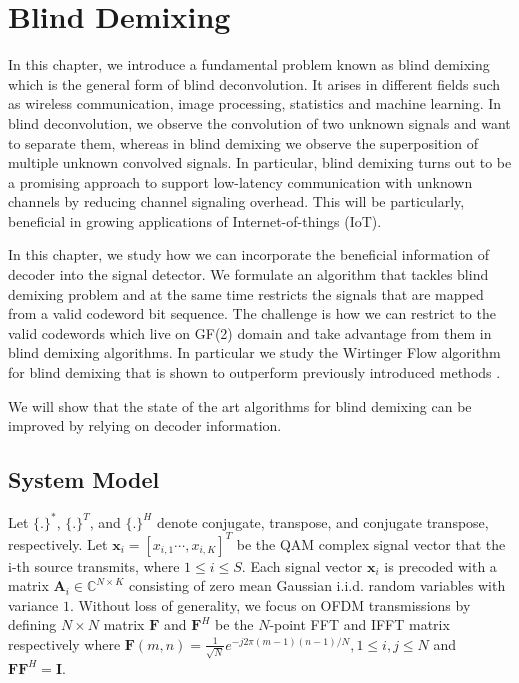 \chapter{Blind Demixing} \label{Chap:demix}
In this chapter, we introduce a fundamental problem known as blind demixing which is the general form of blind deconvolution. 
It arises in different fields such as wireless communication, image processing, statistics and machine learning. 
In blind deconvolution, we observe the convolution of two unknown signals and want to separate them, 
whereas in blind demixing we observe the superposition of multiple unknown convolved signals.
In particular, blind demixing turns out to be a promising approach to support low-latency communication with 
unknown channels by reducing channel signaling overhead. This will be particularly, beneficial in growing applications
of Internet-of-things (IoT).

In this chapter, we study how we can incorporate the beneficial information of decoder
into the signal detector. We formulate an algorithm that tackles blind demixing problem and at the same time
restricts the signals that are mapped from a valid codeword bit sequence. The challenge is how we can restrict to the valid codewords
which live on GF(2) domain and take advantage from them in blind demixing algorithms. In particular we study the Wirtinger Flow algorithm for blind demixing that is shown to 
outperform previously introduced methods \cite{candes2015phase, chen2015solving, ma2017implicit, dong2018nonconvex}. 

We will show that  
the state of the art algorithms for blind demixing can be improved by relying on decoder information.


\section{System Model}
Let $\{.\}^*$, $\{.\}^T$, and $\{.\}^H$ denote conjugate, transpose, and conjugate transpose, respectively.
Let $\mathbf{x}_i=[x_{i,1}\cdots, x_{i,K} ]^T$ be the QAM complex signal vector that the i-th source transmits, where $1\leq i \leq S$. 
Each signal vector $\mathbf{x}_i$ is precoded with a matrix $\mathbf{A}_i \in \mathbb{C} ^{N \times K}$ consisting 
of zero mean Gaussian i.i.d. random variables with variance $1$.
Without loss of generality, we focus on OFDM transmissions by defining $N \times N$ matrix $\mathbf{F}$ and $\mathbf{F}^H$ 
be the $N$-point FFT and IFFT matrix respectively where $\mathbf{F}(m, n)= \frac{1}{\sqrt{N}}e^{-j2\pi(m-1)(n-1)/N}, 1 \leq i , j \leq N$ and $\mathbf{F}\mathbf{F}^H = \mathbf{I}$. 

